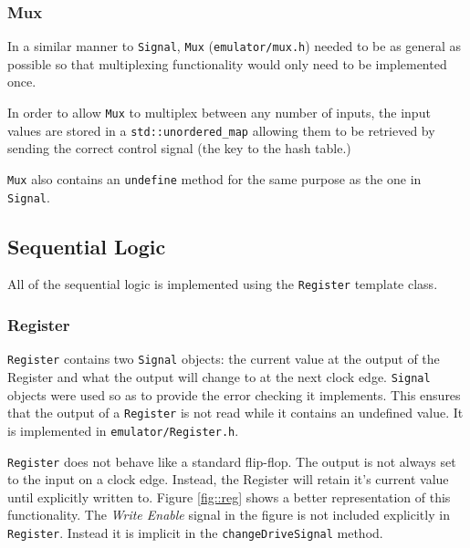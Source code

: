 \documentclass[11pt,a4paper]{IEEEtran}
\begin{document}
			\subsubsection{Mux}
				In a similar manner to \texttt{Signal}, \texttt{Mux} (\texttt{emulator/mux.h}) needed to be as general as possible so that multiplexing functionality would only need to be implemented once. 
				
				In order to allow \texttt{Mux} to multiplex between any number of inputs, the input values are stored in a \texttt{std::unordered\_map} allowing them to be retrieved by sending the correct control signal (the key to the hash table.)
				
				\texttt{Mux} also contains an \texttt{undefine} method for the same purpose as the one in \texttt{Signal}.
		
		\subsection{Sequential Logic}
			All of the sequential logic is implemented using the \texttt{Register} template class.
			\subsubsection{Register}
				\texttt{Register} contains two \texttt{Signal} objects: the current value at the output of the Register and what the output will change to at the next clock edge. \texttt{Signal} objects were used so as to provide the error checking it implements. This ensures that the output of a \texttt{Register} is not read while it contains an undefined value. It is implemented in \texttt{emulator/Register.h}.	
				
				\texttt{Register} does not behave like a standard flip-flop. The output is not always set to the input on a clock edge. Instead, the Register will retain it's current value until explicitly written to. Figure \ref{fig::reg} shows a better representation of this functionality. The \textit{Write Enable} signal in the figure is not included explicitly in \texttt{Register}. Instead it is implicit in the \texttt{changeDriveSignal} method.
				
\end{document}
